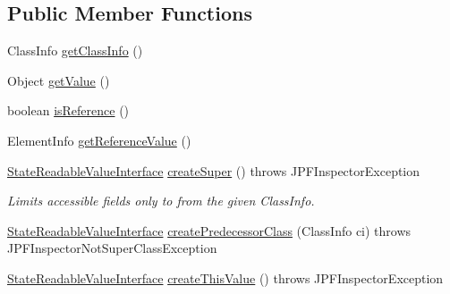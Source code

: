 \subsection*{Public Member Functions}
\begin{DoxyCompactItemize}
\item 
Class\+Info \hyperlink{classgov_1_1nasa_1_1jpf_1_1inspector_1_1server_1_1programstate_1_1_state_readable_const_value_a1d58a24ec5ea23200ee967318be47da1}{get\+Class\+Info} ()
\item 
Object \hyperlink{classgov_1_1nasa_1_1jpf_1_1inspector_1_1server_1_1programstate_1_1_state_readable_const_value_a8f41fea8bf196ac0eb085cf20343e9e8}{get\+Value} ()
\item 
boolean \hyperlink{classgov_1_1nasa_1_1jpf_1_1inspector_1_1server_1_1programstate_1_1_state_readable_const_value_afcdd6cb25aed93629cb43d13850156b0}{is\+Reference} ()
\item 
Element\+Info \hyperlink{classgov_1_1nasa_1_1jpf_1_1inspector_1_1server_1_1programstate_1_1_state_readable_const_value_a109b9eee6a4c6ef9ee588107befe1295}{get\+Reference\+Value} ()
\item 
\hyperlink{interfacegov_1_1nasa_1_1jpf_1_1inspector_1_1server_1_1programstate_1_1_state_readable_value_interface}{State\+Readable\+Value\+Interface} \hyperlink{classgov_1_1nasa_1_1jpf_1_1inspector_1_1server_1_1programstate_1_1_state_readable_const_value_a0355465f46650255ce57cc1cee7dfd06}{create\+Super} ()  throws J\+P\+F\+Inspector\+Exception 
\begin{DoxyCompactList}\small\item\em Limits accessible fields only to from the given Class\+Info. \end{DoxyCompactList}\item 
\hyperlink{interfacegov_1_1nasa_1_1jpf_1_1inspector_1_1server_1_1programstate_1_1_state_readable_value_interface}{State\+Readable\+Value\+Interface} \hyperlink{classgov_1_1nasa_1_1jpf_1_1inspector_1_1server_1_1programstate_1_1_state_readable_const_value_aef0f2f29f8bcf4a5afc4ae0092928064}{create\+Predecessor\+Class} (Class\+Info ci)  throws J\+P\+F\+Inspector\+Not\+Super\+Class\+Exception 
\item 
\hyperlink{interfacegov_1_1nasa_1_1jpf_1_1inspector_1_1server_1_1programstate_1_1_state_readable_value_interface}{State\+Readable\+Value\+Interface} \hyperlink{classgov_1_1nasa_1_1jpf_1_1inspector_1_1server_1_1programstate_1_1_state_readable_const_value_a9a0438bbae36b27e820c905ab5a5a74c}{create\+This\+Value} ()  throws J\+P\+F\+Inspector\+Exception 

\end{DoxyCompactItemize}
